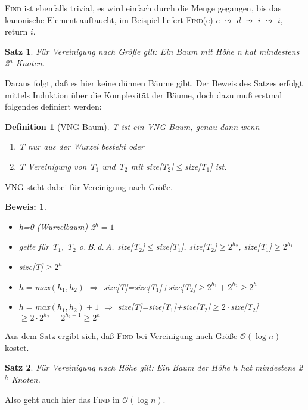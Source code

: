 \documentclass[ngerman,draft,parskip=half*,twoside]{scrreprt}
\theoremstyle{break}
\newtheorem{satz}{Satz}[chapter]
\newtheorem{definition}{Definition}[chapter]
\theoremstyle{nonumberbreak}
\newtheorem{beweis}{Beweis:}
\newcommand*{\OO}{\mathcal{O}}      %
\begin{document}
\textsc{Find} ist ebenfalls trivial, es wird einfach durch die Menge gegangen, bis das kanonische Element auftaucht, im
Beispiel liefert \textsc{Find}(e) $e$ $\leadsto$ $d$ $\leadsto$ $i$ $\leadsto$ $i$, return $i$.

\begin{satz}
Für Vereinigung nach Größe gilt: Ein Baum mit Höhe n hat mindestens 2$^n$ Knoten. 
\end{satz}
Daraus folgt, daß es hier keine dünnen Bäume gibt. Der Beweis des Satzes erfolgt mittels Induktion über die
Komplexität der Bäume, doch dazu muß erstmal folgendes definiert werden:
 
\begin{definition}[VNG-Baum]
T ist ein VNG-Baum, genau dann wenn
\begin{enumerate}
\item T nur aus der Wurzel besteht oder
\item T Vereinigung von T$_1$ und T$_2$ mit size[T$_2$]$\leq$size[T$_1$] ist.
\end{enumerate}
\end{definition}
VNG steht dabei für Vereinigung nach Größe.

\begin{beweis}
\begin{itemize}
\item[IA.] h=0 (Wurzelbaum) 2$^h=1$
\item[IV.] gelte für T$_1$, T$_2$ o.\,B.\,d.\,A. size[T$_2$]$\leq$size[T$_1$], size[T$_2$]$\geq 2^{h_2}$, size[T$_1$]$\geq
2^{h_1}$
\item[IB.] size[T]$\geq 2^h$
\item[1.\,Fall] $h=$max$(h_1, h_2)$ $\Rightarrow$ size[T]=size[T$_1$]+size[T$_2$]$\geq 2^{h_1}+2^{h_2} \geq 2^h$
\item[2.\,Fall] $h=$max$(h_1, h_2)+1$ $\Rightarrow$ size[T]=size[T$_1$]+size[T$_2$]$\geq 2 \cdot $size[T$_2$]$\geq 2
\cdot 2^{h_2} =2^{h_2+1} \geq 2^h$
\end{itemize}
\end{beweis}


Aus dem Satz ergibt sich, daß \textsc{Find} bei Vereinigung nach Größe $\OO(\log n)$ kostet.

\begin{satz}
Für Vereinigung nach Höhe gilt: Ein Baum der Höhe $h$ hat mindestens 2$^h$ Knoten.
\end{satz}
Also geht auch hier das \textsc{Find} in $\OO(\log n)$.
\end{document}
